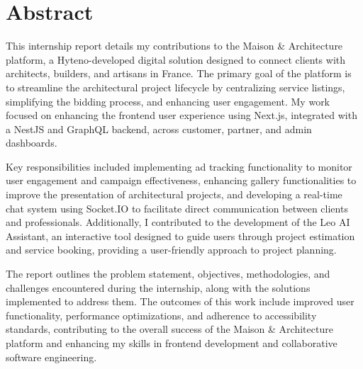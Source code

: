 \chapter*{Abstract}
This internship report details my contributions to the Maison \& Architecture platform, a Hyteno-developed digital solution designed to connect clients with architects, builders, and artisans in France. The primary goal of the platform is to streamline the architectural project lifecycle by centralizing service listings, simplifying the bidding process, and enhancing user engagement. My work focused on enhancing the frontend user experience using Next.js, integrated with a NestJS and GraphQL backend, across customer, partner, and admin dashboards.

Key responsibilities included implementing ad tracking functionality to monitor user engagement and campaign effectiveness, enhancing gallery functionalities to improve the presentation of architectural projects, and developing a real-time chat system using Socket.IO to facilitate direct communication between clients and professionals. Additionally, I contributed to the development of the Leo AI Assistant, an interactive tool designed to guide users through project estimation and service booking, providing a user-friendly approach to project planning.

The report outlines the problem statement, objectives, methodologies, and challenges encountered during the internship, along with the solutions implemented to address them. The outcomes of this work include improved user functionality, performance optimizations, and adherence to accessibility standards, contributing to the overall success of the Maison \& Architecture platform and enhancing my skills in frontend development and collaborative software engineering.
\pagebreak